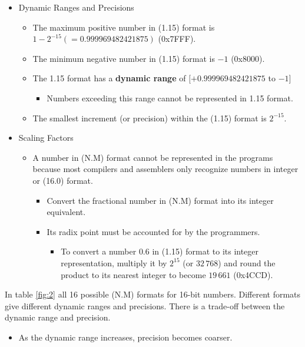\begin{itemize}
	\item Dynamic Ranges and Precisions
	\begin{itemize}
		\item The maximum positive number in (1.15) format is $1 − 2^{−15} (= 0.999969482421875)$ (0x7FFF).
		\item The minimum negative number in (1.15) format is $−1$ (0x8000). 
		\item The 1.15 format has a \textbf{dynamic range} of $[+0.999969482421875$ to $−1]$
		\begin{itemize}
			\item Numbers exceeding this range cannot be represented in 1.15 format. 
		\end{itemize} 
		\item The smallest increment (or precision) within the (1.15) format is $2^{−15}$.
	\end{itemize}
	\item Scaling Factors
	\begin{itemize}
		\item A number in (N.M) format cannot be represented in the programs because most compilers and assemblers only recognize numbers in integer or (16.0) format. 
		\begin{itemize}
			\item Convert the fractional number in (N.M) format into its integer equivalent.
			\item Its radix point must be accounted for by the programmers.
			\begin{itemize}
				\item To convert a number $0.6$ in (1.15) format to its integer representation,
				multiply it by $2^{15}$ (or $32\,768$) and round the product to its nearest integer to
				become $19\,661$ (0x4CCD).
			\end{itemize}
		\end{itemize}
	\end{itemize}
\end{itemize}

 In table \ref{fig:2} all 16 possible (N.M) formats for 16-bit numbers. Different formats give different dynamic ranges and precisions. There is a trade-off between the dynamic range and precision.
 \begin{itemize}
 	\item As the dynamic range increases, precision becomes	coarser.
 \end{itemize}
 
